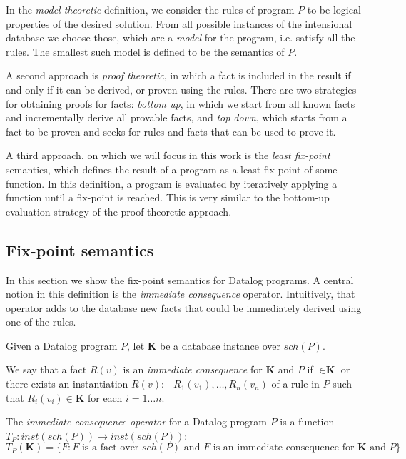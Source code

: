 \documentclass{pracamgr}
\theoremstyle{plain}
\theoremstyle{definition}
\theoremstyle{remark}
\begin{document}
In the \emph{model theoretic} definition, we consider the rules of program $P$ to be logical properties of the desired solution. From all possible instances of the intensional database we choose those, which are a \emph{model} for the program, i.e. satisfy all the rules. The smallest such model is defined to be the semantics of $P$.

A second approach is \emph{proof theoretic}, in which a fact is included in the result if and only if it can be derived, or proven using the rules. There are two strategies for obtaining proofs for facts: \emph{bottom up}, in which we start from all known facts and incrementally derive all provable facts, and \emph{top down}, which starts from a fact to be proven and seeks for rules and facts that can be used to prove it.

A third approach, on which we will focus in this work is the \emph{least fix-point} semantics, which defines the result of a program as a least fix-point of some function. In this definition, a program is evaluated by iteratively applying a function until a fix-point is reached. This is very similar to the bottom-up evaluation strategy of the proof-theoretic approach.

\subsection{Fix-point semantics}
In this section we show the fix-point semantics for Datalog programs. A central notion in this definition is the \emph{immediate consequence} operator. Intuitively, that operator adds to the database new facts that could be immediately derived using one of the rules.

Given a Datalog program $P$, let $\textbf{K}$ be a database instance over $sch(P)$.

We say that a fact $R(v)$ is an \emph{immediate consequence} for $\textbf{K}$ and $P$ if $ \in \textbf{K}$ or there exists an instantiation $R(v) :- R_1(v_1), \dots, R_n(v_n)$ of a rule in $P$ such that $R_i(v_i) \in \textbf{K}$ for each $i = 1\dots n$.

The \emph{immediate consequence operator} for a Datalog program $P$ is a function $T_P: inst(sch(P)) \to inst(sch(P))$:
$$T_P(\textbf{K}) = \{ F: F \text{ is a fact over } sch(P) \text{ and $F$ is an immediate consequence for } \textbf{K} \text{ and } P \}$$
\end{document}
